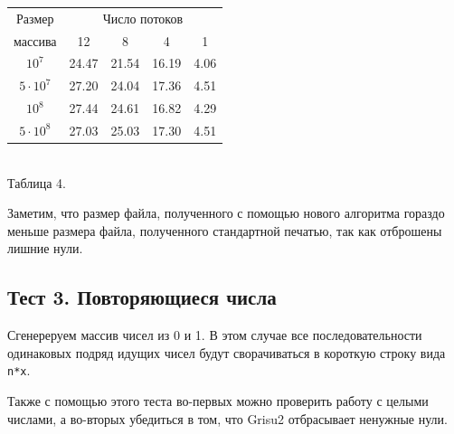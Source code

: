 \begin{center}
\begin{tabular}{||c|c|c|c|c||}
\hline
\hline
Размер & \multicolumn{4}{c|}{Число потоков}\\
\hhline{~|-|-|-|-|}
массива & 12 & 8 & 4 & 1 \\
\hline
$10^7$  & 24.47 & 21.54 & 16.19 & 4.06 \\
\hline
$5 \cdot 10^7$ & 27.20 & 24.04 & 17.36 & 4.51 \\
\hline
$10^8$ & 27.44 & 24.61 & 16.82 & 4.29 \\
\hline
$5 \cdot 10^8$ & 27.03 & 25.03 & 17.30 & 4.51 \\
\hline
\hline
\end{tabular}
\\\vspace{10pt}
\small{Таблица 4.}
\end{center}
Заметим, что размер файла, полученного с помощью нового алгоритма гораздо меньше размера файла, полученного стандартной печатью, так как отброшены лишние нули.

\subsection{Тест 3. Повторяющиеся числа}
Сгенереруем массив чисел из 0 и 1.
В этом случае все последовательности одинаковых подряд идущих чисел будут сворачиваться в короткую строку вида \texttt{n*x}.

Также с помощью этого теста во-первых можно проверить работу с целыми числами, а во-вторых убедиться в том, что \textsf{Grisu2} отбрасывает ненужные нули.

